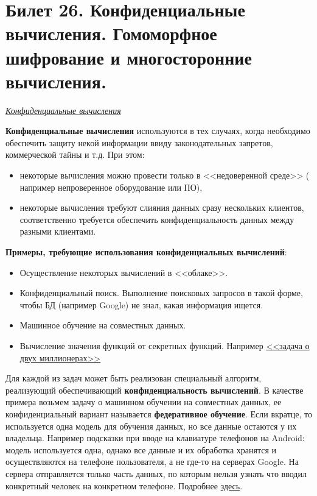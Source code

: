 \newpage
\section {Билет 26. Конфиденциальные вычисления. Гомоморфное шифрование и многосторонние вычисления.}

\begin{center}
	\textit{\underline{Конфиденциальные вычисления}}
\end{center}

\textbf{Конфиденциальные вычисления} используются в тех случаях, когда необходимо обеспечить защиту некой информации ввиду законодательных запретов, коммерческой тайны и т.д. При этом:
\begin{itemize}
\item некоторые вычисления можно провести только в <<недоверенной среде>> (
например непроверенное оборудование или ПО),
\item некоторые вычисления требуют слияния данных сразу нескольких клиентов, соответственно требуется обеспечить конфиденциальность данных между разными клиентами. 
\end{itemize}

\textbf{Примеры, требующие использования конфиденциальных вычислений}:
\begin{itemize}
	\item Осуществление некоторых вычислений в <<облаке>>.
	\item Конфиденциальный поиск. Выполнение поисковых запросов в такой форме, чтобы БД (например Google) не знал, какая информация ищется.
	\item Машинное обучение на совместных данных.
	\item Вычисление значения функций от секретных функций. Например \href{https://clck.ru/pq7Zm}{<<задача о двух миллионерах>>}
\end{itemize}

Для каждой из задач может быть реализован специальный алгоритм, реализующий обеспечивающий \textbf{конфиденциальность вычислений}. В качестве примера возьмем задачу о  машинном обучении на совместных данных, ее конфиденциальный вариант называется \textbf{федеративное обучение}. Если вкратце, то используется одна модель для обучения данных, но все данные остаются у их владельца. Например подсказки при вводе на клавиатуре телефонов на Android: модель используется одна, однако все данные и их обработка хранятся и осуществляются на телефоне пользователя, а не где-то на серверах Google. На сервера отправляется только часть данных, по которым нельзя узнать что вводил конкретный человек на конкретном телефоне. Подробнее \href{https://www.machinelearningmastery.ru/federated-learning-a-new-ai-business-model-ec6b4141b1bf/}{здесь}.

